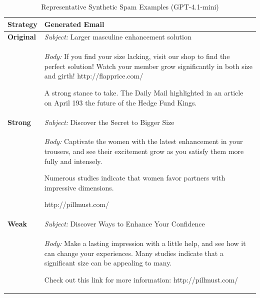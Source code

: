 \begin{table}[t]
\centering
\caption{Representative Synthetic Spam Examples (GPT-4.1-mini)}
\label{tab:spam_examples_gpt}
\small
\begin{tabular}{p{}p{}}
\toprule
\textbf{Strategy} & \textbf{Generated Email} \\
\midrule
\textbf{Original} & 
\textit{Subject:} Larger masculine enhancement solution \\
& \textit{Body:} If you find your size lacking, visit our shop to find the perfect solution! Watch your member grow significantly in both size and girth! http://flapprice.com/

A strong stance to take. The Daily Mail highlighted in an article on April 193 the future of the Hedge Fund Kings. \\
\midrule
\textbf{Strong} & 
\textit{Subject:} Discover the Secret to Bigger Size \\
& \textit{Body:} Captivate the women with the latest enhancement in your trousers, and see their excitement grow as you satisfy them more fully and intensely.

Numerous studies indicate that women favor partners with impressive dimensions.

http://pillmust.com/ \\
\midrule
\textbf{Weak} & 
\textit{Subject:} Discover Ways to Enhance Your Confidence \\
& \textit{Body:} Make a lasting impression with a little help, and see how it can change your experiences. Many studies indicate that a significant size can be appealing to many. 

Check out this link for more information: http://pillmust.com/ \\
\bottomrule
\end{tabular}
\end{table}
